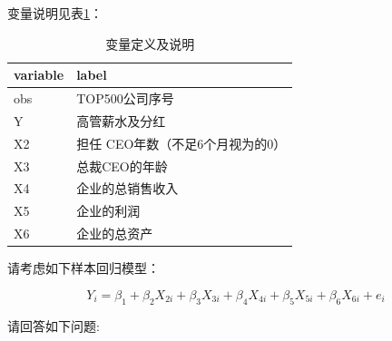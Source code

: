 \documentclass[12pt,(landscape,a4paper),(portrait,a4paper)]{article}
\begin{document}
变量说明见表\ref{tab:label-salary}：

\begin{table}

\caption{\label{tab:label-salary}变量定义及说明}
\centering
\begin{tabular}[t]{l|l}
\hline
variable & label\\
\hline
obs & TOP500公司序号\\
\hline
Y & 高管薪水及分红\\
\hline
X2 & 担任 CEO年数（不足6个月视为的0）\\
\hline
X3 & 总裁CEO的年龄\\
\hline
X4 & 企业的总销售收入\\
\hline
X5 & 企业的利润\\
\hline
X6 & 企业的总资产\\
\hline
\end{tabular}
\end{table}

请考虑如下样本回归模型：

\begin{equation}
Y_i=\beta_1+\beta_2X_{2i}+\beta_3X_{3i}+\beta_4X_{4i}+\beta_5X_{5i}+\beta_6X_{6i}+e_{i} \label{eq:M0-salary}
\end{equation}

请回答如下问题:
\end{document}
